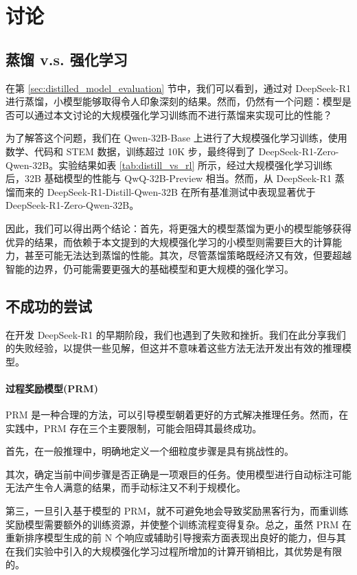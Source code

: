 \documentclass[lang=cn,a4paper,newtx]{elegantpaper}
\newcommand{\dsri}{DeepSeek-R1}
\newcommand{\dsro}{DeepSeek-R1-Zero}
\begin{document}
\section{讨论}

\subsection{蒸馏 v.s. 强化学习}



在第 \ref{sec:distilled_model_evaluation} 节中，我们可以看到，通过对 DeepSeek-R1 进行蒸馏，小模型能够取得令人印象深刻的结果。然而，仍然有一个问题：模型是否可以通过本文讨论的大规模强化学习训练而不进行蒸馏来实现可比的性能？

为了解答这个问题，我们在 Qwen-32B-Base 上进行了大规模强化学习训练，使用数学、代码和 STEM 数据，训练超过 10K 步，最终得到了 \dsro{}-Qwen-32B。实验结果如表 \ref{tab:distill_vs_rl} 所示，经过大规模强化学习训练后，32B 基础模型的性能与 QwQ-32B-Preview 相当。然而，从 DeepSeek-R1 蒸馏而来的 DeepSeek-R1-Distill-Qwen-32B 在所有基准测试中表现显著优于 \dsro{}-Qwen-32B。

因此，我们可以得出两个结论：首先，将更强大的模型蒸馏为更小的模型能够获得优异的结果，而依赖于本文提到的大规模强化学习的小模型则需要巨大的计算能力，甚至可能无法达到蒸馏的性能。其次，尽管蒸馏策略既经济又有效，但要超越智能的边界，仍可能需要更强大的基础模型和更大规模的强化学习。

\subsection{不成功的尝试}

在开发 \dsri{} 的早期阶段，我们也遇到了失败和挫折。我们在此分享我们的失败经验，以提供一些见解，但这并不意味着这些方法无法开发出有效的推理模型。

\paragraph{过程奖励模型(PRM)}

PRM 是一种合理的方法，可以引导模型朝着更好的方式解决推理任务。然而，在实践中，PRM 存在三个主要限制，可能会阻碍其最终成功。

首先，在一般推理中，明确地定义一个细粒度步骤是具有挑战性的。 

其次，确定当前中间步骤是否正确是一项艰巨的任务。使用模型进行自动标注可能无法产生令人满意的结果，而手动标注又不利于规模化。

第三，一旦引入基于模型的 PRM，就不可避免地会导致奖励黑客行为，而重训练奖励模型需要额外的训练资源，并使整个训练流程变得复杂。总之，虽然 PRM 在重新排序模型生成的前 N 个响应或辅助引导搜索方面表现出良好的能力，但与其在我们实验中引入的大规模强化学习过程所增加的计算开销相比，其优势是有限的。
\end{document}
